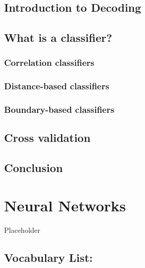 \documentclass[
]{book}
\begin{document}
\hypertarget{introduction-to-decoding}{%
\section{Introduction to Decoding}\label{introduction-to-decoding}}

\hypertarget{what-is-a-classifier}{%
\section{What is a classifier?}\label{what-is-a-classifier}}

\hypertarget{correlation-classifiers}{%
\subsection{Correlation classifiers}\label{correlation-classifiers}}

\hypertarget{distance-based-classifiers}{%
\subsection{Distance-based classifiers}\label{distance-based-classifiers}}

\hypertarget{boundary-based-classifiers}{%
\subsection{Boundary-based classifiers}\label{boundary-based-classifiers}}

\hypertarget{cross-validation}{%
\section{Cross validation}\label{cross-validation}}

\hypertarget{conclusion}{%
\section{Conclusion}\label{conclusion}}

\hypertarget{Ch8}{%
\chapter{Neural Networks}\label{Ch8}}

Placeholder

\hypertarget{vocabulary-list}{%
\section{Vocabulary List:}\label{vocabulary-list}}
\end{document}
